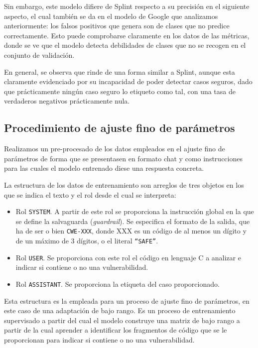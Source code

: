 \documentclass[12pt, a4paper, twoside]{article}
\begin{document}
Sin embargo, este modelo difiere de Splint respecto a su precisión en el siguiente aspecto, el cual también se da en el modelo de Google que analizamos anteriormente: los falsos positivos que genera son de clases que no predice correctamente. Esto puede comprobarse claramente en los datos de las métricas, donde se ve que el modelo detecta debilidades de clases que no se recogen en el conjunto de validación.

En general, se observa que rinde de una forma similar a Splint, aunque esta claramente evidenciado por su incapacidad de poder detectar casos seguros, dado que prácticamente ningún caso seguro lo etiqueto como tal, con una tasa de verdaderos negativos prácticamente nula.

\subsection{Procedimiento de ajuste fino de parámetros}
Realizamos un pre-procesado de los datos empleados en el ajuste fino de parámetros de forma que se presentasen en formato chat y como instrucciones para las cuales el modelo entrenado diese una respuesta concreta.

La estructura de los datos de entrenamiento son arreglos de tres objetos en los que se indica el texto y el rol desde el cual se interpreta:

\begin{itemize}
	\item Rol \texttt{SYSTEM}. A partir de este rol se proporciona la instrucción global en la que se define la salvaguarda (\textit{guardrail}). Se especifica el formato de la salida, que ha de ser o bien \texttt{CWE-XXX}, donde XXX es un código de al menos un dígito y de un máximo de 3 dígitos, o el literal \texttt{\enquote{SAFE}}.
	\item Rol \texttt{USER}. Se proporciona con este rol el código en lenguaje C a analizar e indicar si contiene o no una vulnerabilidad.
	\item Rol \texttt{ASSISTANT}. Se proporciona la etiqueta del caso proporcionado.
\end{itemize}

Esta estructura es la empleada para un proceso de ajuste fino de parámetros, en este caso de una adaptación de bajo rango. Es un proceso de entrenamiento supervisado a partir del cual el modelo construye una matriz de bajo rango a partir de la cual aprender a identificar los fragmentos de código que se le proporcionan para indicar si contiene o no una vulnerabilidad.
\end{document}
